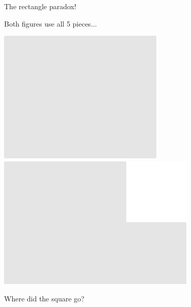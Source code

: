 \documentclass[14pt]{beamer}
\begin{document}

    \begin{frame}{The rectangle paradox!}
        \begin{center}
            Both figures use all 5 pieces...

            \vspace{36pt}

            \;\;\includegraphics[scale=0.5]{figures/figure022b.pdf}\qquad
            \qquad
            \includegraphics[scale=0.5]{figures/figure022e.pdf}

            \vspace{32pt}

            Where did the square go?
        \end{center}
    \end{frame}
\end{document}
